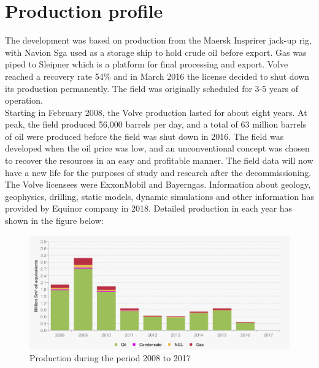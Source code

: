 \documentclass[12pt,a4paper]{report}
\begin{document}
\section{Production profile}
The development was based on production from the Maersk Insprirer jack-up rig, with Navion Sga used as a storage ship to hold crude oil before export. Gas was piped to Sleipner which is a platform for final processing and export. Volve reached a recovery rate 54\% and in March 2016 the license decided to shut down its production permanently. The field was originally scheduled for 3-5 years of operation. \\
Starting in February 2008, the Volve production lasted for about eight years. At peak, the field produced 56,000 barrels per day, and a total of 63 million barrels of oil were produced before the field was shut down in 2016. The field was developed when the oil price was low, and an unconventional concept was chosen to recover the resources in an easy and profitable manner. The field data will now have a new life for the purposes of study and research after the decommissioning. The Volve licensees were ExxonMobil and Bayerngas. Information about geology, geophysics, drilling, static models, dynamic simulations and other information has provided by Equinor company in 2018\cite{Volve}.
Detailed production in each year has shown in the figure below:
\begin{figure}[H]
\centering
\includegraphics[width=1.0\textwidth]{Volve/Production}
\caption{Production during the period 2008 to 2017}
\end{figure}
\end{document}
